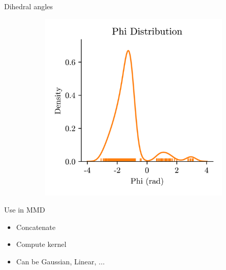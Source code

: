 \documentclass[aspectratio=169, 10pt, dvipsnames]{beamer}
\begin{document}
{\begin{frame}[fragile]{Dihedral angles}
\begin{minipage}{0.3\textwidth}
\begin{adjustbox}{minipage=\linewidth,scale=0.8}
\begin{figure}
\begin{subfigure}{\textwidth}
          \end{subfigure}
          \begin{subfigure}{\textwidth}
            \includegraphics[width=\textwidth]{./figures/dehedral_dist_phi.png}
          \end{subfigure}
        \end{figure}
      \end{adjustbox}
    \end{minipage}
    \pause\begin{minipage}{0.28\textwidth}
      \begin{alert}{Use in MMD}
        \begin{itemize}
        \item\small Concatenate
        \item\small Compute kernel
        \item\small Can be Gaussian, Linear, ...
        \end{itemize}

      \end{alert}
    \end{minipage}
  \end{frame}
}
\end{document}
